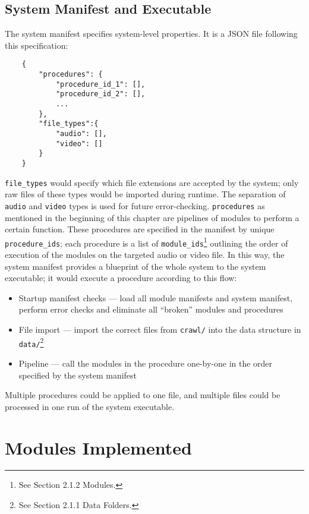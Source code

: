 \subsection{System Manifest and Executable}

The system manifest specifies system-level properties. It is a JSON file following this specification:

\begin{lstlisting}
    {
        "procedures": {
            "procedure_id_1": [],
            "procedure_id_2": [],
            ...
        },
        "file_types":{
            "audio": [],
            "video": []
        }
    }
\end{lstlisting}

\verb|file_types| would specify which file extensions are accepted by the system; only raw files of these types would be imported during runtime. The separation of \verb|audio| and \verb|video| types is used for future error-checking. \verb|procedures| as mentioned in the beginning of this chapter are pipelines of modules to perform a certain function. These procedures are specified in the manifest by unique \verb|procedure_ids|; each procedure is a list of \verb|module_ids|\footnote{See Section 2.1.2 Modules.} outlining the order of execution of the modules on the targeted audio or video file. In this way, the system manifest provides a blueprint of the whole system to the system executable; it would execute a procedure according to this flow:

\begin{itemize}
    \item Startup manifest checks --- load all module manifests and system manifest, perform error checks and eliminate all ``broken'' modules and procedures
    \item File import --- import the correct files from \verb|crawl/| into the data structure in \verb|data/|\footnote{See Section 2.1.1 Data Folders.}
    \item Pipeline --- call the modules in the procedure one-by-one in the order specified by the system manifest
\end{itemize}

Multiple procedures could be applied to one file, and multiple files could be processed in one run of the system executable.

\section{Modules Implemented}